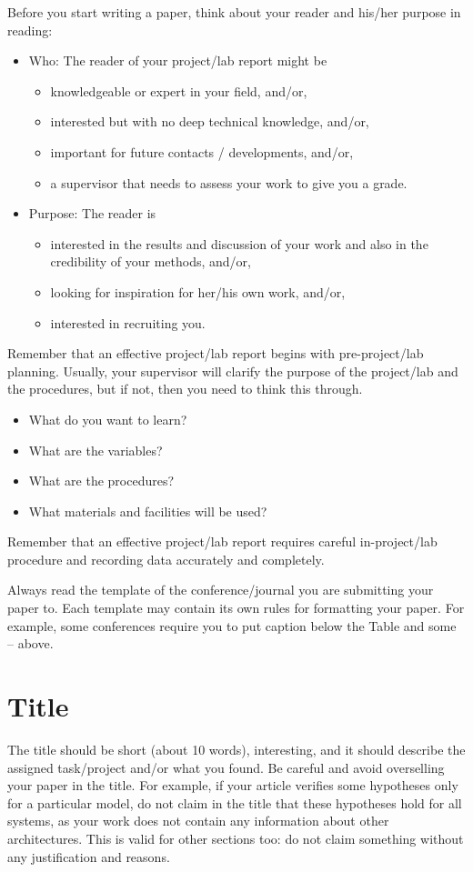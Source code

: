 \documentclass[10pt,conference,compsocconf]{IEEEtran}
\begin{document}
Before you start writing  a paper, think about your reader and his/her purpose in reading:
\begin{itemize}
	\item Who: The reader of your project/lab report might be
	\begin{itemize}
		\item knowledgeable or expert in your field, and/or,
		\item interested but with no deep technical knowledge, and/or,
		\item important for future contacts / developments, and/or,
		\item a supervisor that needs to assess your work to give you a grade.
	\end{itemize}
	\item Purpose: The reader is
	\begin{itemize}
		\item interested in the results and discussion of your work and also in the credibility of your methods, and/or,
		\item looking for inspiration for her/his own work, and/or,
		\item interested in recruiting you.
	\end{itemize}
\end{itemize}

Remember that an effective project/lab report begins with pre-project/lab planning. Usually, your supervisor will clarify the purpose of the project/lab and the procedures, but if not, then you need to think this through. 
\begin{itemize}
	\item What do you want to learn?
	\item What are the variables?
	\item What are the procedures?
	\item What materials and facilities will be used?
\end{itemize}

Remember that an effective project/lab report requires careful in-project/lab procedure and recording data accurately and completely.

Always read the template of the conference/journal you are submitting your paper to. Each template may contain its own rules for formatting your paper. For example, some conferences require you to put caption below the Table and some -- above.

\section*{Title}
The title should be short (about 10 words), interesting, and it should describe the assigned task/project and/or what you found. Be careful and avoid overselling your paper in the title. For example, if your article verifies some hypotheses only for a particular model, do not claim in the title that these hypotheses hold for all systems, as your work does not contain any information about other architectures. This is valid for other sections too: do not claim something without any justification and reasons.
\end{document}
